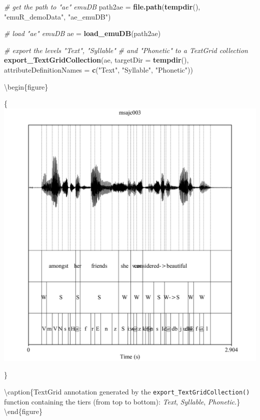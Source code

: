 \documentclass[]{book}
\newenvironment{Shaded}{\begin{snugshade}}{\end{snugshade}}
\newcommand{\CommentTok}[1]{\textcolor[rgb]{0.56,0.35,0.01}{\textit{#1}}}
\newcommand{\DataTypeTok}[1]{\textcolor[rgb]{0.13,0.29,0.53}{#1}}
\newcommand{\KeywordTok}[1]{\textcolor[rgb]{0.13,0.29,0.53}{\textbf{#1}}}
\newcommand{\NormalTok}[1]{#1}
\newcommand{\StringTok}[1]{\textcolor[rgb]{0.31,0.60,0.02}{#1}}
\begin{document}
\begin{Shaded}
\begin{Highlighting}[]
\CommentTok{# get the path to "ae" emuDB}
\NormalTok{path2ae =}\StringTok{ }\KeywordTok{file.path}\NormalTok{(}\KeywordTok{tempdir}\NormalTok{(), }\StringTok{"emuR_demoData"}\NormalTok{, }\StringTok{"ae_emuDB"}\NormalTok{)}

\CommentTok{# load "ae" emuDB}
\NormalTok{ae =}\StringTok{ }\KeywordTok{load_emuDB}\NormalTok{(path2ae)}

\CommentTok{# export the levels "Text", "Syllable"}
\CommentTok{# and "Phonetic" to a TextGrid collection}
\KeywordTok{export_TextGridCollection}\NormalTok{(ae,}
                          \DataTypeTok{targetDir =} \KeywordTok{tempdir}\NormalTok{(),}
                          \DataTypeTok{attributeDefinitionNames =} \KeywordTok{c}\NormalTok{(}\StringTok{"Text"}\NormalTok{,}
                                                       \StringTok{"Syllable"}\NormalTok{,}
                                                       \StringTok{"Phonetic"}\NormalTok{))}
\end{Highlighting}
\end{Shaded}

\textbackslash{}begin\{figure\}

\{\centering \includegraphics[width=0.75\linewidth]{pics/msajc003_fromExport}

\}

\textbackslash{}caption\{TextGrid annotation generated by the \texttt{export\_TextGridCollection()} function containing the tiers (from top to bottom): \emph{Text}, \emph{Syllable}, \emph{Phonetic}.\}\label{fig:emuRfuncs-msajc003-fromExport}
\textbackslash{}end\{figure\}
\end{document}
